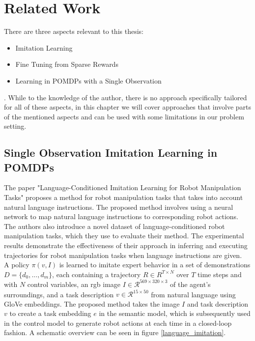 
\chapter{Related Work}
\label{chapter:RelWork}
There are three aspects relevant to this thesis:
\begin{itemize}
    \item Imitation Learning
    \item Fine Tuning from Sparse Rewards
    \item Learning in POMDPs with a Single Observation
\end{itemize}
. While to the knowledge of the author, there is no approach specifically tailored for all of these aspects, in this chapter we will cover approaches that involve parts 
of the mentioned aspects and can be used with some limitations in our problem setting.

\section{Single Observation Imitation Learning in POMDPs}
The paper "Language-Conditioned Imitation Learning for Robot Manipulation Tasks" \cite{Language-Conditioned Imitation} proposes a method for robot manipulation tasks that takes 
into account natural language instructions. The proposed method involves using a neural network to map natural language instructions to 
corresponding robot actions. The authors also introduce a novel dataset of language-conditioned robot manipulation tasks, which they use to evaluate 
their method. The experimental results demonstrate the effectiveness of their approach in inferring and executing trajectories for robot manipulation 
tasks when language instructions are given.\\

A policy $\pi(v,I)$ is learned to imitate expert behavior in a set of demonstrations $D = \{d_0,...,d_m\}$, each containing a trajectory 
$R \in R^{T \times N}$ over $T$ time steps and with $N$ control variables, an rgb image $I \in \mathcal{R}^{569 \times 320 \times 3}$ of the agent's surroundings, 
and a task description $v \in \mathcal{R}^{15 \times 50}$ from natural language using GloVe \cite{GloVe} embeddings. The proposed method takes the image $I$ and task description $v$ 
to create a task embedding $e$ in the semantic model, which is subsequently used in the control model to generate robot actions at each time in a closed-loop 
fashion. A schematic overview can be seen in figure \ref{language_imitation}.

